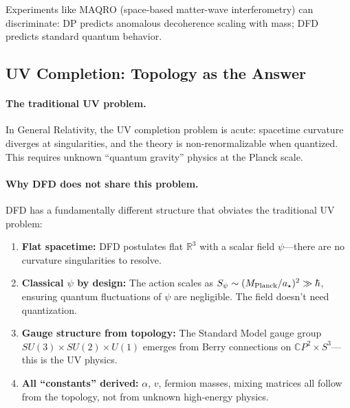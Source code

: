 Experiments like MAQRO (space-based matter-wave interferometry) can discriminate: DP predicts anomalous decoherence scaling with mass; DFD predicts standard quantum behavior.

\subsection{UV Completion: Topology as the Answer}\label{sec:open-uv}

\paragraph{The traditional UV problem.}
In General Relativity, the UV completion problem is acute: spacetime curvature diverges at singularities, and the theory is non-renormalizable when quantized. This requires unknown ``quantum gravity'' physics at the Planck scale.

\paragraph{Why DFD does not share this problem.}
DFD has a fundamentally different structure that obviates the traditional UV problem:

\begin{enumerate}
\item \textbf{Flat spacetime:} DFD postulates flat $\mathbb{R}^3$ with a scalar field $\psi$---there are no curvature singularities to resolve.

\item \textbf{Classical $\psi$ by design:} The action scales as $S_\psi \sim (M_{\rm Planck}/a_\star)^2 \gg \hbar$, ensuring quantum fluctuations of $\psi$ are negligible. The field doesn't need quantization.

\item \textbf{Gauge structure from topology:} The Standard Model gauge group $SU(3) \times SU(2) \times U(1)$ emerges from Berry connections on $\mathbb{C}P^2 \times S^3$---this is the UV physics.

\item \textbf{All ``constants'' derived:} $\alpha$, $v$, fermion masses, mixing matrices all follow from the topology, not from unknown high-energy physics.
\end{enumerate}

